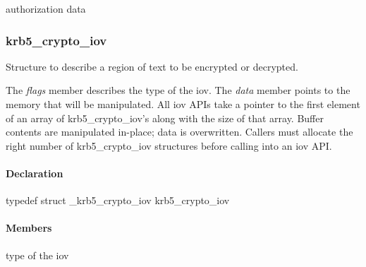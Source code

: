 \documentclass[letterpaper,10pt,english]{sphinxmanual}
\begin{document}

\begin{fulllineitems}
\label{appdev/refs/types/krb5_creds:krb5_creds.authdata}
authorization data

\end{fulllineitems}



\subsubsection{krb5\_crypto\_iov}
\label{appdev/refs/types/krb5_crypto_iov:krb5-crypto-iov}\label{appdev/refs/types/krb5_crypto_iov::doc}\label{appdev/refs/types/krb5_crypto_iov:krb5-crypto-iov-struct}

\begin{fulllineitems}
\label{appdev/refs/types/krb5_crypto_iov:krb5_crypto_iov}
\end{fulllineitems}


Structure to describe a region of text to be encrypted or decrypted.

The \emph{flags} member describes the type of the iov. The \emph{data} member points to the memory that will be manipulated. All iov APIs take a pointer to the first element of an array of krb5\_crypto\_iov's along with the size of that array. Buffer contents are manipulated in-place; data is overwritten. Callers must allocate the right number of krb5\_crypto\_iov structures before calling into an iov API.


\paragraph{Declaration}
\label{appdev/refs/types/krb5_crypto_iov:declaration}
typedef struct \_krb5\_crypto\_iov  krb5\_crypto\_iov


\paragraph{Members}
\label{appdev/refs/types/krb5_crypto_iov:members}

\begin{fulllineitems}
\label{appdev/refs/types/krb5_crypto_iov:krb5_crypto_iov.flags}
 type of the iov

\end{fulllineitems}
\end{document}
